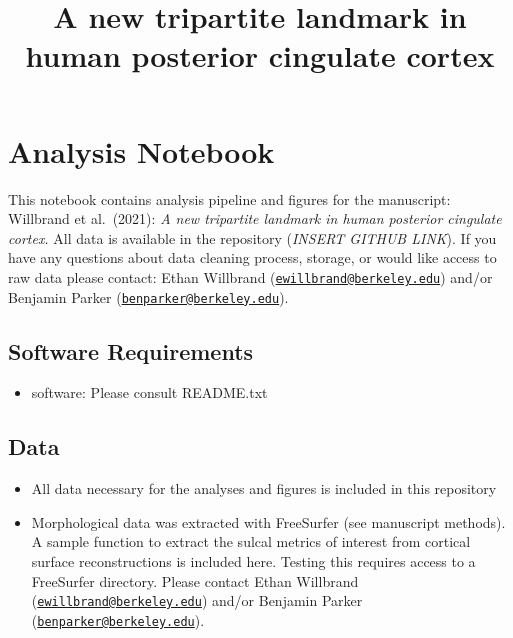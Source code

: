 \documentclass[
]{article}
\title{A new tripartite landmark in human posterior cingulate cortex}
\author{}
\date{\vspace{-2.5em}}
\providecommand{\tightlist}{%
  \setlength{\itemsep}{0pt}\setlength{\parskip}{0pt}}
\begin{document}
\maketitle

\hypertarget{analysis-notebook}{%
\section{Analysis Notebook}\label{analysis-notebook}}

This notebook contains analysis pipeline and figures for the manuscript:
Willbrand et al.~(2021): \emph{A new tripartite landmark in human
posterior cingulate cortex.} All data is available in the repository
(\emph{INSERT GITHUB LINK}). If you have any questions about data
cleaning process, storage, or would like access to raw data please
contact: Ethan Willbrand
(\href{mailto:ewillbrand@berkeley.edu}{\nolinkurl{ewillbrand@berkeley.edu}})
and/or Benjamin Parker
(\href{mailto:benparker@berkeley.edu}{\nolinkurl{benparker@berkeley.edu}}).

\hypertarget{software-requirements}{%
\subsection{Software Requirements}\label{software-requirements}}

\begin{itemize}
\tightlist
\item
  software: Please consult README.txt
\end{itemize}

\hypertarget{data}{%
\subsection{Data}\label{data}}

\begin{itemize}
\tightlist
\item
  All data necessary for the analyses and figures is included in this
  repository
\item
  Morphological data was extracted with FreeSurfer (see manuscript
  methods). A sample function to extract the sulcal metrics of interest
  from cortical surface reconstructions is included here. Testing this
  requires access to a FreeSurfer directory. Please contact Ethan
  Willbrand
  (\href{mailto:ewillbrand@berkeley.edu}{\nolinkurl{ewillbrand@berkeley.edu}})
  and/or Benjamin Parker
  (\href{mailto:benparker@berkeley.edu}{\nolinkurl{benparker@berkeley.edu}}).
\end{itemize}
\end{document}
